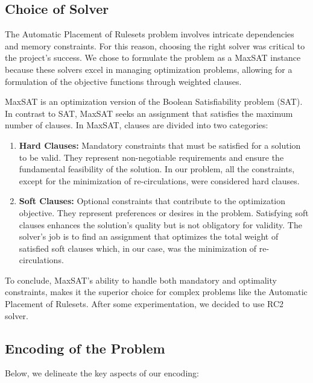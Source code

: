 \subsection{Choice of Solver}

The Automatic Placement of Rulesets problem involves intricate dependencies and memory constraints. For this reason, choosing the right solver was critical to the project's success. We chose to formulate the problem as a MaxSAT instance because these solvers excel in managing optimization problems, allowing for a formulation of the objective functions through weighted clauses.

MaxSAT is an optimization version of the Boolean Satisfiability problem (SAT). In contrast to SAT, MaxSAT seeks an assignment that satisfies the maximum number of clauses. In MaxSAT, clauses are divided into two categories:

\begin{enumerate}
    \item \textbf{Hard Clauses:} Mandatory constraints that must be satisfied for a solution to be valid. They represent non-negotiable requirements and ensure the fundamental feasibility of the solution. In our problem, all the constraints, except for the minimization of re-circulations, were considered hard clauses.

    \item \textbf{Soft Clauses:} Optional constraints that contribute to the optimization objective. They represent preferences or desires in the problem. Satisfying soft clauses enhances the solution's quality but is not obligatory for validity. The solver's job is to find an assignment that optimizes the total weight of satisfied soft clauses which, in our case, was the minimization of re-circulations.
\end{enumerate}

To conclude, MaxSAT's ability to handle both mandatory and optimality constraints, makes it the superior choice for complex problems like the Automatic Placement of Rulesets. After some experimentation, we decided to use RC2 solver.

\subsection{Encoding of the Problem}

Below, we delineate the key aspects of our encoding:

